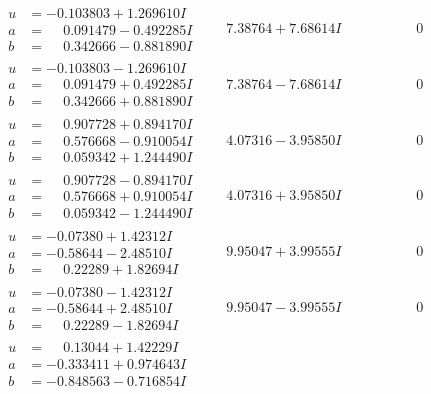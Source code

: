 \documentclass[1p]{elsarticle_modified}
\theoremstyle{definition}
\begin{document}
$$\begin{array}{c|c|c}
\begin{aligned}
u &= -0.103803 + 1.269610 I \\
a &= \phantom{-}0.091479 - 0.492285 I \\
b &= \phantom{-}0.342666 - 0.881890 I\end{aligned}
 & \phantom{-}7.38764 + 7.68614 I & \phantom{-0.000000 } 0 \\ \hline\begin{aligned}
u &= -0.103803 - 1.269610 I \\
a &= \phantom{-}0.091479 + 0.492285 I \\
b &= \phantom{-}0.342666 + 0.881890 I\end{aligned}
 & \phantom{-}7.38764 - 7.68614 I & \phantom{-0.000000 } 0 \\ \hline\begin{aligned}
u &= \phantom{-}0.907728 + 0.894170 I \\
a &= \phantom{-}0.576668 - 0.910054 I \\
b &= \phantom{-}0.059342 + 1.244490 I\end{aligned}
 & \phantom{-}4.07316 - 3.95850 I & \phantom{-0.000000 } 0 \\ \hline\begin{aligned}
u &= \phantom{-}0.907728 - 0.894170 I \\
a &= \phantom{-}0.576668 + 0.910054 I \\
b &= \phantom{-}0.059342 - 1.244490 I\end{aligned}
 & \phantom{-}4.07316 + 3.95850 I & \phantom{-0.000000 } 0 \\ \hline\begin{aligned}
u &= -0.07380 + 1.42312 I \\
a &= -0.58644 - 2.48510 I \\
b &= \phantom{-}0.22289 + 1.82694 I\end{aligned}
 & \phantom{-}9.95047 + 3.99555 I & \phantom{-0.000000 } 0 \\ \hline\begin{aligned}
u &= -0.07380 - 1.42312 I \\
a &= -0.58644 + 2.48510 I \\
b &= \phantom{-}0.22289 - 1.82694 I\end{aligned}
 & \phantom{-}9.95047 - 3.99555 I & \phantom{-0.000000 } 0 \\ \hline\begin{aligned}
u &= \phantom{-}0.13044 + 1.42229 I \\
a &= -0.333411 + 0.974643 I \\
b &= -0.848563 - 0.716854 I\end{aligned}

\end{array}$$
\end{document}
